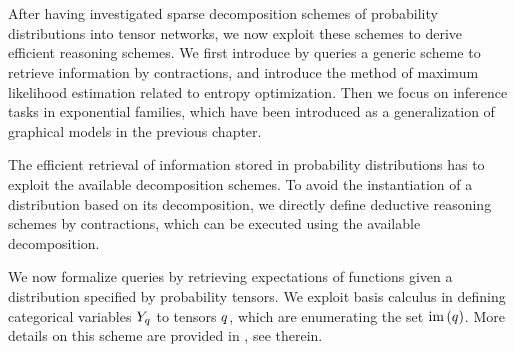\chapter{\chatextprobReasoning}\label{cha:probReasoning}

After having investigated sparse decomposition schemes of probability distributions into tensor networks, we now exploit these schemes to derive efficient reasoning schemes. %
We first introduce by queries a generic scheme to retrieve information by contractions, and introduce the method of maximum likelihood estimation related to entropy optimization.
Then we focus on inference tasks in exponential families, which have been introduced as a generalization of graphical models in the previous chapter.



The efficient retrieval of information stored in probability distributions has to exploit the available decomposition schemes.
To avoid the instantiation of a distribution based on its decomposition, we directly define deductive reasoning schemes by contractions, which can be executed using the available decomposition.


We now formalize queries by retrieving expectations of functions given a distribution specified by probability tensors.
We exploit basis calculus in defining categorical variables $Y_{q}$ to tensors $q$, which are enumerating the set $\mathrm{im}\left(q\right)$.
More details on this scheme are provided in , see  therein.

